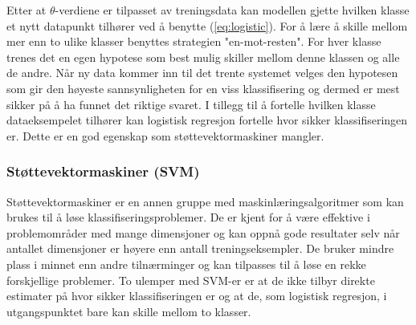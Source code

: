 Etter at $\theta$-verdiene er tilpasset av treningsdata kan modellen gjette hvilken klasse et nytt datapunkt tilhører ved å benytte (\ref{eq:logistic}). For å lære å skille mellom mer enn to ulike klasser benyttes strategien "en-mot-resten". For hver klasse trenes det en egen hypotese som best mulig skiller mellom denne klassen og alle de andre. Når ny data kommer inn til det trente systemet velges den hypotesen som gir den høyeste sannsynligheten for en viss klassifisering og dermed er mest sikker på å ha funnet det riktige svaret. I tillegg til å fortelle hvilken klasse dataeksempelet tilhører kan logistisk regresjon fortelle hvor sikker klassifiseringen er. Dette er en god egenskap som støttevektormaskiner mangler.

\subsubsection*{Støttevektormaskiner (SVM)}
Støttevektormaskiner er en annen gruppe med maskinlæringsalgoritmer som kan brukes til å løse klassifiseringsproblemer. De er kjent for å være effektive i problemområder med mange dimensjoner og kan oppnå gode resultater selv når antallet dimensjoner er høyere enn antall treningseksempler. De bruker mindre plass i minnet enn andre tilnærminger og kan tilpasses til å løse en rekke forskjellige problemer. To ulemper med SVM-er er at de ikke tilbyr direkte estimater på hvor sikker klassifiseringen er og at de, som logistisk regresjon, i utgangspunktet bare kan skille mellom to klasser.

